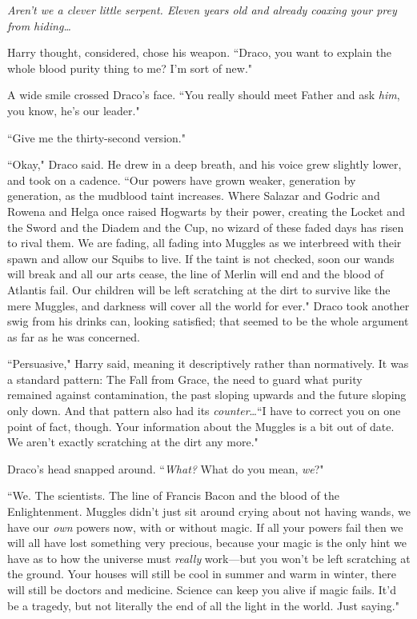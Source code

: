 \emph{Aren't we a clever little serpent. Eleven years old and already coaxing your prey from hiding…}

Harry thought, considered, chose his weapon. ``Draco, you want to explain the whole blood purity thing to me? I'm sort of new."

A wide smile crossed Draco's face. ``You really should meet Father and ask \emph{him}, you know, he's our leader."

``Give me the thirty-second version."

``Okay," Draco said. He drew in a deep breath, and his voice grew slightly lower, and took on a cadence. ``Our powers have grown weaker, generation by generation, as the mudblood taint increases. Where Salazar and Godric and Rowena and Helga once raised Hogwarts by their power, creating the Locket and the Sword and the Diadem and the Cup, no wizard of these faded days has risen to rival them. We are fading, all fading into Muggles as we interbreed with their spawn and allow our Squibs to live. If the taint is not checked, soon our wands will break and all our arts cease, the line of Merlin will end and the blood of Atlantis fail. Our children will be left scratching at the dirt to survive like the mere Muggles, and darkness will cover all the world for ever." Draco took another swig from his drinks can, looking satisfied; that seemed to be the whole argument as far as he was concerned.

``Persuasive," Harry said, meaning it descriptively rather than normatively. It was a standard pattern: The Fall from Grace, the need to guard what purity remained against contamination, the past sloping upwards and the future sloping only down. And that pattern also had its \emph{counter}…``I have to correct you on one point of fact, though. Your information about the Muggles is a bit out of date. We aren't exactly scratching at the dirt any more."

Draco's head snapped around. ``\emph{What?} What do you mean, \emph{we}?"

``We. The scientists. The line of Francis Bacon and the blood of the Enlightenment. Muggles didn't just sit around crying about not having wands, we have our \emph{own} powers now, with or without magic. If all your powers fail then we will all have lost something very precious, because your magic is the only hint we have as to how the universe must \emph{really} work—but you won't be left scratching at the ground. Your houses will still be cool in summer and warm in winter, there will still be doctors and medicine. Science can keep you alive if magic fails. It'd be a tragedy, but not literally the end of all the light in the world. Just saying."

